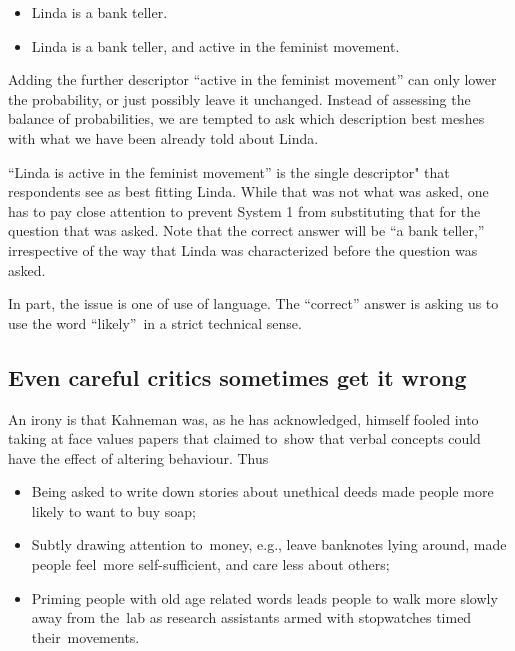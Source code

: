 \documentclass[
  10pt,
  b5paper]{book}
\providecommand{\tightlist}{%
  \setlength{\itemsep}{0pt}\setlength{\parskip}{0pt}}
\begin{document}
\begin{itemize}
\tightlist
\item
  Linda is a bank teller.
\item
  Linda is a bank teller, and active in the feminist
  movement.
\end{itemize}

Adding the further descriptor ``active in the feminist
movement'' can only lower the probability, or just possibly
leave it unchanged. Instead of assessing the balance of
probabilities, we are tempted to ask which description best
meshes with what we have been already told about Linda.

``Linda is active in the feminist movement'' is the single
descriptor" that respondents see as best fitting Linda.
While that was not what was asked, one has to pay close
attention to prevent System 1 from substituting that for
the question that was asked. Note that the correct
answer will be ``a bank teller,'' irrespective of the way
that Linda was characterized before the question was asked.

In part, the issue is one of use of language. The ``correct''
answer is asking us to use the word ``likely''~in a strict
technical sense.

\hypertarget{even-careful-critics-sometimes-get-it-wrong}{%
\subsection*{Even careful critics sometimes get it wrong}\label{even-careful-critics-sometimes-get-it-wrong}}

An irony is that Kahneman was, as he has acknowledged,
himself fooled into taking at face values papers that
claimed to~show that verbal concepts could have the
effect of altering behaviour. Thus

\begin{itemize}
\tightlist
\item
  Being asked to write down stories about unethical deeds
  made people more likely to want to buy soap;
\item
  Subtly drawing attention to~money, e.g., leave banknotes
  lying around, made people feel~more self-sufficient, and
  care less about others;
\item
  Priming people with old age related words leads people to
  walk more slowly away from the~lab as research
  assistants armed with stopwatches timed their~movements.
\end{itemize}
\end{document}

